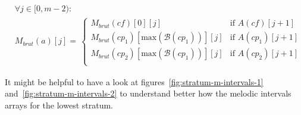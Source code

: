 \begin{equation}
    \begin{aligned}
        &\forall j \in [0, m-2):\\
        &M_{brut}(a)[j] = \,  
        \begin{cases}
            M_{brut}(\mathit{cf})[0][j] & \text{if } A(\mathit{cf})[j+1]\\
            M_{brut}(cp_1)[\text{max}(\mathcal{B}(cp_1))][j] & \text{if } A(cp_1)[j+1]\\
            M_{brut}(cp_2)[\text{max}(\mathcal{B}(cp_1))][j] & \text{if } A(cp_2)[j+1]\\
        \end{cases}
    \end{aligned}
\end{equation}

\noindent It might be helpful to have a look at figures~\ref{fig:stratum-m-intervals-1} and~\ref{fig:stratum-m-intervals-2} to understand better how the melodic intervals arrays for the lowest stratum.


